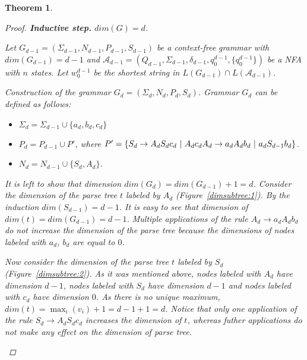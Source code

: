 \documentclass[11pt,a4paper]{article} %
\newtheorem{theorem}{Theorem}
\begin{document}
\begin{theorem}
\begin{proof}
\textbf{Inductive step.} $dim(G) = d$.

Let $G_{d-1} =  (\Sigma_{d-1}, N_{d-1}, P_{d-1}, S_{d-1})$ be a context-free grammar with $dim(G_{d-1}) = d-1$ and $\mathcal{A}_{d-1}= (Q_{d-1},\Sigma_{d-1} ,\delta_{d-1} ,q^{d-1}_{0},\{q^{d-1}_{0}\})$  be a NFA with $n$ states. Let $w_0^{d-1}$ be the shortest string in $L(G_{d-1}) \cap L(\mathcal{A}_{d-1})$.

\textit{Construction of the grammar $G_d = (\Sigma_{d}, N_{d}, P_{d}, S_{d})$}. Grammar $G_d$ can be defined as follows:
\begin{itemize}
\item $\Sigma_{d} = \Sigma_{d-1} \cup \{a_d, b_d, c_d\}$
\item $P_{d} = P_{d-1} \cup P'$, where $P' = 
\{ 
\\ S_d \rightarrow A_d S_d c_d\ \vert \ A_d c_d
\\ A_d \rightarrow a_d A_d b_d\ \vert \ a_d S_{d-1}  b_d
\\  \}$. 
\item $N_d = N_{d-1} \cup \{S_d, A_d\}$. 
\end{itemize}
It is left to show that dimension $dim(G_d) = dim(G_{d-1}) + 1 = d$. Consider the dimension of the parse tree $t$ labeled by $A_d$ (Figure~\ref{dimsubtree:1}). By the induction $dim(S_{d-1}) = d-1$. It is easy to see that dimension of $dim(t) = dim(G_{d-1}) = d-1$. Multiple applications of the rule $A_d \rightarrow a_d A_d b_d$ do not increase the dimension of the parse tree because the dimensions of nodes labeled with $a_d$, $b_d$ are equal to $0$.


Now consider the dimension of the parse tree $t$ labeled by $S_d$ (Figure~\ref{dimsubtree:2}). As it was mentioned above, nodes labeled with $A_d$ have dimension $d -1$, nodes labeled with $S_d$ have dimension $d -1$ and  nodes labeled with $c_d$ have dimension $0$. As there is no unique maximum, $dim(t) = \max_{i} (v_i) + 1 = d - 1 + 1 = d$. Notice that only one application of the rule  $S_d \rightarrow A_d S_d c_d$ increases the dimension of $t$, whereas futher applications do not make any effect on the dimension of parse tree.

\begin{figure}
\centering
\begin{subfigure}{.5\textwidth}
  \centering
\begin{tikzpicture}[
level 1/.style={sibling distance=2cm},
level 2/.style={sibling distance=1.5cm}]


\end{tikzpicture}
\end{subfigure}
\end{figure}
\end{proof}
\end{theorem}
\end{document}
